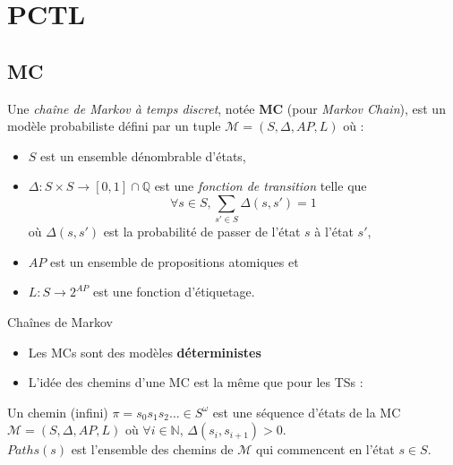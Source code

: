 \documentclass[compress]{beamer}
\begin{document}
\section{PCTL}
\subsection{MC}
\begin{frame}
  \small
  \begin{definition}
  	Une \textit{chaîne de Markov à temps discret}, notée \textbf{MC} (pour \textit{Markov Chain}), est un modèle probabiliste défini par un tuple  $\mathcal{M} = (S, \Delta, AP, L)$ où :
  	\begin{itemize}
  		\item $S$ est un ensemble dénombrable d'états,
  		\item $\Delta: S \times S \rightarrow [0,1] \cap \mathbb{Q}$ est une \textit{fonction de transition} telle que \[\forall s \in S, \sum_{s' \in S}\Delta(s, s')= 1\]
  		où $\Delta(s, s')$ est la probabilité de passer de l'état $s$ à l'état $s'$,
      \item $AP$ est un ensemble de propositions atomiques et
      \item $L: S \rightarrow 2^{AP}$ est une fonction d'étiquetage.
  	\end{itemize}
  \end{definition}
\end{frame}

\begin{frame}{Chaînes de Markov}
  \normalsize
  \begin{itemize}
    \item Les MCs sont des modèles \textbf{\color{fibeamer@orange}déterministes}
    \item L'idée des chemins d'une MC est la même que pour les TSs :
  \end{itemize}
  \begin{definition}
      Un {\color{fibeamer@orange}chemin} (infini) $\pi = s_0 s_1 s_2 \dots \in S^\omega$ est une séquence d'états de la MC
      $\mathcal{M} = (S, \Delta, AP, L)$ où $\forall i \in \mathbb{N}$, $\Delta(s_i, s_{i+1}) > 0$. \\
      $Paths(s)$ est l'ensemble des chemins de $\mathcal{M}$ qui commencent
      en l'état $s \in S$.
  \end{definition}
\end{frame}
\normalsize
\end{document}

